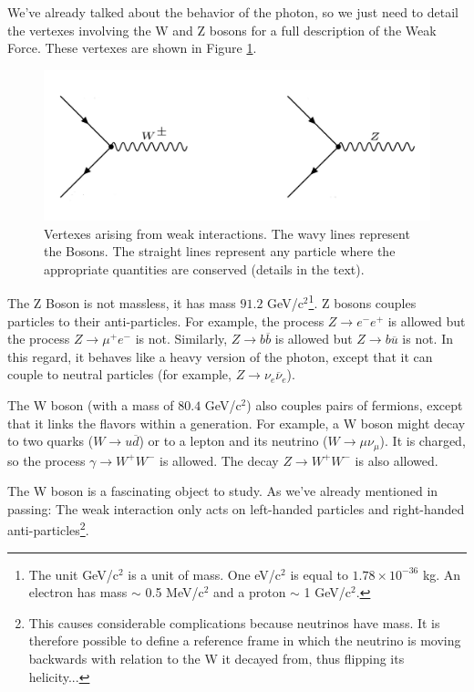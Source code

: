 We've already talked about the behavior of the photon, so we just need to detail the vertexes involving the W and Z bosons for a full description of the Weak Force. These vertexes are shown in Figure \ref{Fig:Intro:Vertex3}.
\begin{figure}[h]
    \centering
        \includegraphics[width=\textwidth]{F1/Vertex3}
        \caption{Vertexes arising from weak interactions. The wavy lines represent the Bosons. The straight lines represent any particle where the appropriate quantities are conserved (details in the text).}
        \label{Fig:Intro:Vertex3}
\end{figure}
The Z Boson is not massless, it has mass $91.2$ GeV/c$^2$\footnote{The unit GeV/c$^2$ is a unit of mass. One eV/c$^2$ is equal to $1.78 \times 10^{-36}$ kg. An electron has mass $\sim$ 0.5 MeV/c$^2$ and a proton $\sim$ 1 GeV/c$^2$.}. Z bosons couples particles to their anti-particles. For example, the process $Z\rightarrow e^-e^+$ is allowed but the process $Z\rightarrow\mu^+e^-$ is not. Similarly, $Z\rightarrow b\overline{b}$ is allowed but $Z\rightarrow b\overline{u}$ is not. In this regard, it behaves like a heavy version of the photon, except that it can couple to neutral particles (for example, $Z\rightarrow\nu_e\overline{\nu}_e$).

The W boson (with a mass of $80.4$ GeV/c$^2$) also couples pairs of fermions, except that it links the flavors within a generation. For example, a W boson might decay to two quarks ($W\rightarrow u\overline{d}$) or to a lepton and its neutrino ($W\rightarrow\mu\nu_\mu$). It is charged, so the process $\gamma\rightarrow W^+W^-$ is allowed. The decay $Z\rightarrow W^+W^-$ is also allowed.

The W boson is a fascinating object to study. As we've already mentioned in passing: The weak interaction only acts on left-handed particles and right-handed anti-particles\footnote{This causes considerable complications because neutrinos have mass. It is therefore possible to define a reference frame in which the neutrino is moving backwards with relation to the W it decayed from, thus flipping its helicity...}.

